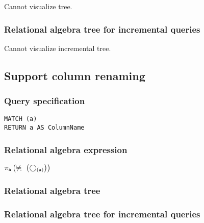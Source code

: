 Cannot visualize tree.

\subsubsection*{Relational algebra tree for incremental queries}

Cannot visualize incremental tree.

\subsection{Support column renaming}

\subsubsection*{Query specification}

\begin{lstlisting}
MATCH (a)
RETURN a AS ColumnName
\end{lstlisting}

\subsubsection*{Relational algebra expression}

$\projection{\var{a}} \left(\alldifferent{} \left(\getvertices{a}{}\right)\right)$

\subsubsection*{Relational algebra tree}


\subsubsection*{Relational algebra tree for incremental queries}


